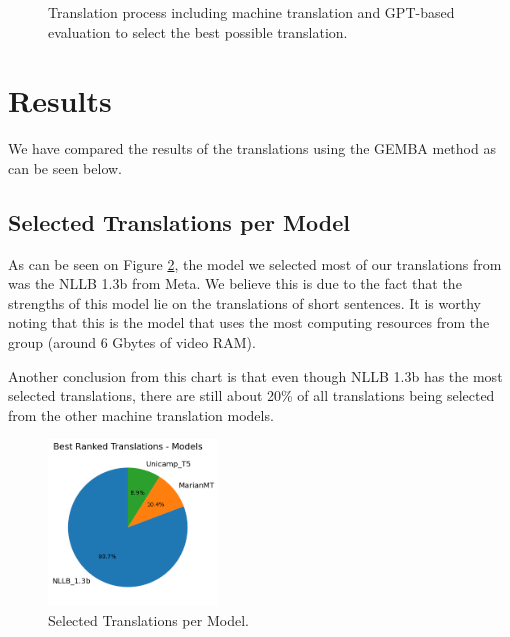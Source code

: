 \documentclass{article}
\begin{document}
\begin{figure}[htbp]
    \centering
    \caption{\label{fig:diagram}Translation process including machine
    translation and GPT-based evaluation to select the best possible
    translation.}
\end{figure}
\FloatBarrier

\section{Results}

We have compared the results of the translations using the GEMBA method as can be seen below.

\subsection{Selected Translations per Model}

As can be seen on Figure \ref{fig:pie}, the model we selected most of our
translations from was the NLLB 1.3b from Meta. We believe this is due to the
fact that the strengths of this model lie on the translations of short
sentences. It is worthy noting that this is the model that uses the most
computing resources from the group (around 6 Gbytes of video RAM).

Another conclusion from this chart is that even though NLLB 1.3b has the most
selected translations, there are still about 20\% of all translations being
selected from the other machine translation models.

\begin{figure}[htbp]
    \centering
    \includegraphics[width=0.4\textwidth]{figures/pie-chart.png}
    \caption{\label{fig:pie}Selected Translations per Model.}
\end{figure}
\FloatBarrier
\end{document}
